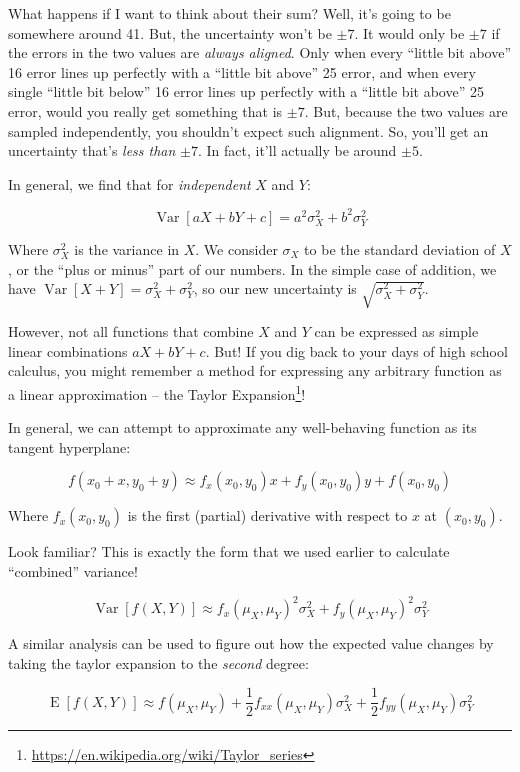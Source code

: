 \documentclass[]{article}
\renewcommand{\href}[2]{#2\footnote{\url{#1}}}
\begin{document}
What happens if I want to think about their sum? Well, it's going to be
somewhere around 41. But, the uncertainty won't be \(\pm 7\). It would
only be \(\pm 7\) if the errors in the two values are \emph{always
aligned}. Only when every ``little bit above'' 16 error lines up
perfectly with a ``little bit above'' 25 error, and when every single
``little bit below'' 16 error lines up perfectly with a ``little bit
above'' 25 error, would you really get something that is \(\pm 7\). But,
because the two values are sampled independently, you shouldn't expect
such alignment. So, you'll get an uncertainty that's \emph{less than}
\(\pm 7\). In fact, it'll actually be around \(\pm 5\).

In general, we find that for \emph{independent} \(X\) and \(Y\):

\[
\operatorname{Var}[aX + bY + c] = a^2 \sigma_X^2 + b^2 \sigma_Y^2
\]

Where \(\sigma_X^2\) is the variance in \(X\). We consider \(\sigma_X\)
to be the standard deviation of \(X\), or the ``plus or minus'' part of
our numbers. In the simple case of addition, we have
\(\operatorname{Var}[X + Y] = \sigma_X^2 + \sigma_Y^2\), so our new
uncertainty is \(\sqrt{\sigma_X^2 + \sigma_Y^2}\).

However, not all functions that combine \(X\) and \(Y\) can be expressed
as simple linear combinations \(aX + bY + c\). But! If you dig back to
your days of high school calculus, you might remember a method for
expressing any arbitrary function as a linear approximation -- the
\href{https://en.wikipedia.org/wiki/Taylor_series}{Taylor Expansion}!

In general, we can attempt to approximate any well-behaving function as
its tangent hyperplane:

\[
f(x_0 + x, y_0 + y) \approx f_x(x_0, y_0) x + f_y(x_0, y_0) y + f(x_0, y_0)
\]

Where \(f_x(x_0,y_0)\) is the first (partial) derivative with respect to
\(x\) at \((x_0, y_0)\).

Look familiar? This is exactly the form that we used earlier to
calculate ``combined'' variance!

\[
\operatorname{Var}[f(X,Y)] \approx f_x(\mu_X, \mu_Y)^2 \sigma_X^2 + f_y(\mu_X,\mu_Y)^2 \sigma_Y^2
\]

A similar analysis can be used to figure out how the expected value
changes by taking the taylor expansion to the \emph{second} degree:

\[
\operatorname{E}[f(X,Y)] \approx
f(\mu_X, \mu_Y) +
\frac{1}{2} f_{xx}(\mu_X, \mu_Y) \sigma_X^2 +
\frac{1}{2} f_{yy}(\mu_X, \mu_Y) \sigma_Y^2
\]
\end{document}
